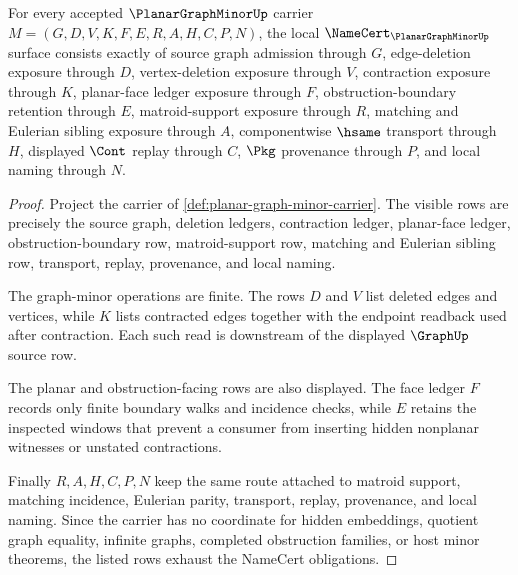 \begin{theorem}
\label{thm:planar-graph-minor-namecert-obligations}
For every accepted $\PlanarGraphMinorUp$ carrier $M=(G,D,V,K,F,E,R,A,H,C,P,N)$, the local $\NameCert_{\PlanarGraphMinorUp}$ surface consists exactly of source graph admission through $G$, edge-deletion exposure through $D$, vertex-deletion exposure through $V$, contraction exposure through $K$, planar-face ledger exposure through $F$, obstruction-boundary retention through $E$, matroid-support exposure through $R$, matching and Eulerian sibling exposure through $A$, componentwise $\hsame$ transport through $H$, displayed $\Cont$ replay through $C$, $\Pkg$ provenance through $P$, and local naming through $N$.
\end{theorem}
\begin{proof}
Project the carrier of \autoref{def:planar-graph-minor-carrier}. The visible rows are precisely the source graph, deletion ledgers, contraction ledger, planar-face ledger, obstruction-boundary row, matroid-support row, matching and Eulerian sibling row, transport, replay, provenance, and local naming.

The graph-minor operations are finite. The rows $D$ and $V$ list deleted edges and vertices, while $K$ lists contracted edges together with the endpoint readback used after contraction. Each such read is downstream of the displayed $\GraphUp$ source row.

The planar and obstruction-facing rows are also displayed. The face ledger $F$ records only finite boundary walks and incidence checks, while $E$ retains the inspected windows that prevent a consumer from inserting hidden nonplanar witnesses or unstated contractions.

Finally $R,A,H,C,P,N$ keep the same route attached to matroid support, matching incidence, Eulerian parity, transport, replay, provenance, and local naming. Since the carrier has no coordinate for hidden embeddings, quotient graph equality, infinite graphs, completed obstruction families, or host minor theorems, the listed rows exhaust the NameCert obligations.
\end{proof}

